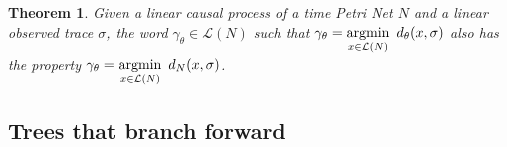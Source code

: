 \documentclass{article}
\DeclareMathOperator*{\argmin}{argmin}
\newtheorem{theorem}{Theorem}
\theoremstyle{Definition}
\theoremstyle{definition}
\begin{document}
\begin{theorem}\label{MixAlign} Given a linear causal process of a time Petri Net $N$ and a linear observed trace $\sigma$, the word $\gamma_\theta \in \mathcal{L}(N)$ such that $\gamma_\theta = \underset{x \in \mathcal{L}(N)}{\argmin} \hspace{0.5em}{d_\theta(x, \sigma)}$ also has the property $\gamma_\theta = \underset{x \in \mathcal{L}(N)}{\argmin} \hspace{0.5em}{d_N(x, \sigma)}$. 
\end{theorem}


	\subsection{Trees that branch forward} 
	
%
%	
%		
%		
%		
%		
%		
%		
\end{document}
